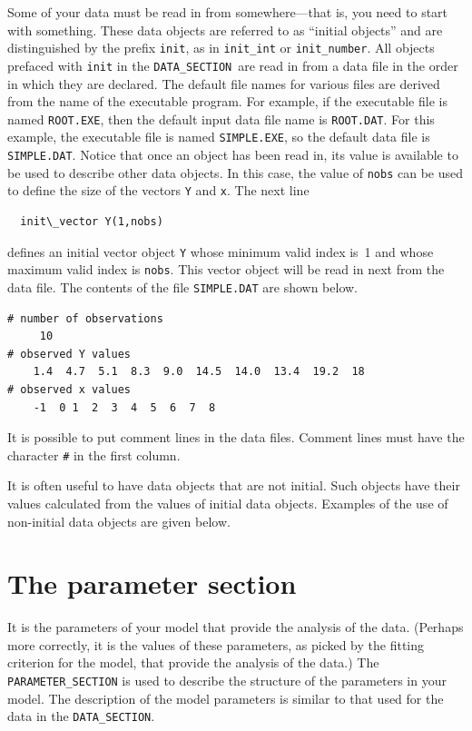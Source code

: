 \documentclass{admbmanual}
\newcommand\DS{\texttt{DATA\_SECTION}}
\begin{document}
Some of your data must be read in from somewhere---that is,
you need to start with something. These data objects are 
referred to as ``initial objects'' and are
distinguished by the prefix \texttt{init}, as in \texttt{init\_int}
or \texttt{init\_number}.
All objects prefaced with \texttt{init} in the \DS\ are 
read in from a data file in the order in which they are declared. 
The default file names for various files are derived from the
name of the executable program. For example, if the executable file is named
\texttt{ROOT.EXE}, then  the default input data file name is \texttt{ROOT.DAT}. 
For this example, the executable file is named \texttt{SIMPLE.EXE},
so the default data file is \texttt{SIMPLE.DAT}.
Notice that
once an object has been read in, its value is available
to be used to describe other data objects. In this case, the
value of \texttt{nobs} can be used to define the size of the
vectors \texttt{Y} and \texttt{x}. The next line
\begin{lstlisting}
  init\_vector Y(1,nobs)
\end{lstlisting}
defines an initial vector object \texttt{Y} whose minimum valid index is~1
and whose maximum valid index is \texttt{nobs}. This vector
object will be read in next from the data file.
The contents of the file \texttt{SIMPLE.DAT} are shown below. 
\begin{lstlisting}
# number of observations
     10
# observed Y values
    1.4  4.7  5.1  8.3  9.0  14.5  14.0  13.4  19.2  18 
# observed x values
    -1  0 1  2  3  4  5  6  7  8        
\end{lstlisting}
It is possible to put comment lines in the data files.
Comment lines must have the character {\tt\#} in the first
column.

It is often useful to have data objects that are not initial.
Such objects have their values calculated from the values of
initial data objects. Examples of the use of non-initial data objects
are given below.


\section{The parameter section}

It is the parameters of your model that
provide the analysis of the data.  (Perhaps more correctly, it
is the values of these parameters, as picked by the
fitting criterion for the model, that provide the
analysis of the data.)
The \texttt{PARAMETER\_SECTION} is used to describe the structure of the  
parameters in your model.
The description of the model parameters is similar to that used for
the data in the \DS.
\end{document}
